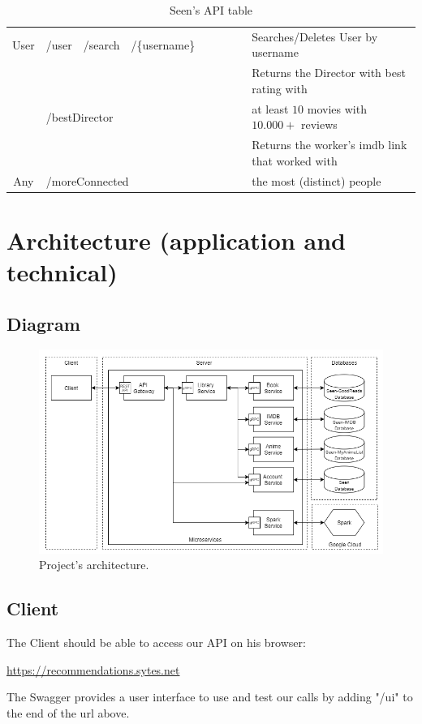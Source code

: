 \documentclass[oneside]{article}
\newcommand{\xmark}{\ding{53}} %
\newcommand*\fpar{\hspace{1ex}}
\begin{document}
\begin{table}[H]
\begin{adjustbox}{width=1.4\textwidth}
\begin{tabular}{ c|l l l l|c|c|c|c|l }
    \multirow{-2}{*}{User} 
    & /user & /search & \multicolumn{2}{l|}{/\{username\}} &
    \xmark & & & \xmark &
    Searches/Deletes User by username
    \\ \hhline{-|----|-|-|-|-|~}
    & \multicolumn{4}{l|}{} &
     & & & &
    Returns the Director with best rating with \\
    & \multicolumn{4}{l|}{\multirow{-2}{*}{/bestDirector}} &
    \multirow{-2}{*}{\xmark}
     & & & &
    at least $10$ movies with $10.000+$ reviews
    \\ 
    & \multicolumn{4}{l|}{} &
     & & & &
    Returns the worker's imdb link that worked with \\
    \multirow{-4}{*}{Any} 
    & \multicolumn{4}{l|}{\multirow{-2}{*}{/moreConnected}} &
    \multirow{-2}{*}{\xmark} & & & &
    the most (distinct) people
  \end{tabular}
  \end{adjustbox}
  \caption{Seen's API table}
\end{table}

\section{Architecture (application and technical)}
\label{sec:architecture}
  \subsection{Diagram}
  \begin{figure}[H]
    \centering
    \includegraphics[width=\textwidth]{ CloudNativeAppArchitecture.png }
    \caption{Project's architecture.}
    \label{img:architecture}
  \end{figure}

  \subsection{Client}
  \fpar The Client should be able to access our API on his browser:
  \begin{center}
    \url{https://recommendations.sytes.net}
  \end{center}
  \par The Swagger provides a user interface to use and test our calls by adding "/ui" to the end of the url above.
\end{document}
